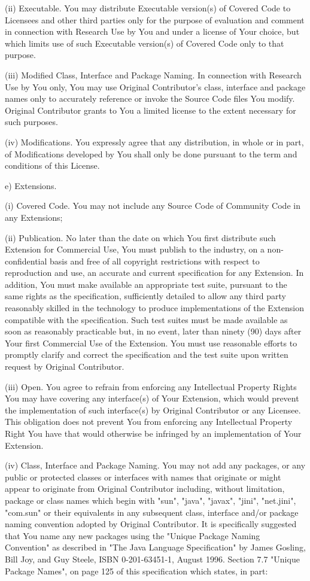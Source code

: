{(ii) Executable.  You may distribute Executable version(s) of Covered
Code to Licensees and other third parties only for the purpose of
evaluation and comment in connection with Research Use by You and
under a license of Your choice, but which limits use of such
Executable version(s) of Covered Code only to that purpose.

(iii) Modified Class, Interface and Package Naming. In connection with
Research Use by You only, You may use Original Contributor's class,
interface and package names only to accurately reference or invoke the
Source Code files You modify.  Original Contributor grants to You a
limited license to the extent necessary for such purposes.

(iv) Modifications.  You expressly agree that any distribution, in
whole or in part, of Modifications developed by You shall only be done
pursuant to the term and conditions of this License.

e) Extensions.

(i) Covered Code.  You may not include any Source Code of Community
Code in any Extensions;

(ii) Publication.  No later than the date on which You first
distribute such Extension for Commercial Use, You must publish to the
industry, on a non-confidential basis and free of all copyright
restrictions with respect to reproduction and use, an accurate and
current specification for any Extension.  In addition, You must make
available an appropriate test suite, pursuant to the same rights as
the specification, sufficiently detailed to allow any third party
reasonably skilled in the technology to produce implementations of the
Extension compatible with the specification.  Such test suites must be
made available as soon as reasonably practicable but, in no event,
later than ninety (90) days after Your first Commercial Use of the
Extension.  You must use reasonable efforts to promptly clarify and
correct the specification and the test suite upon written request by
Original Contributor.

(iii) Open.  You agree to refrain from enforcing any Intellectual
Property Rights You may have covering any interface(s) of Your
Extension, which would prevent the implementation of such interface(s)
by Original Contributor or any Licensee.  This obligation does not
prevent You from enforcing any Intellectual Property Right You have
that would otherwise be infringed by an implementation of Your
Extension.

(iv) Class, Interface and Package Naming.  You may not add any
packages, or any public or protected classes or interfaces with names
that originate or might appear to originate from Original Contributor
including, without limitation, package or class names which begin with
"sun", "java", "javax", "jini", "net.jini", "com.sun" or their
equivalents in any subsequent class, interface and/or package naming
convention adopted by Original Contributor.  It is specifically
suggested that You name any new packages using the "Unique Package
Naming Convention" as described in "The Java Language Specification"
by James Gosling, Bill Joy, and Guy Steele, ISBN 0-201-63451-1, August
1996.  Section 7.7 "Unique Package Names", on page 125 of this
specification which states, in part:

}
